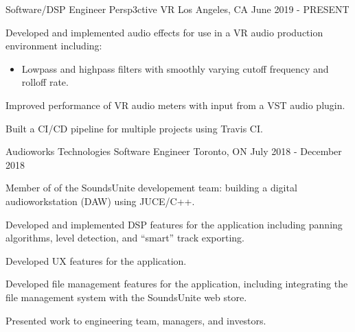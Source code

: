

\begin{cventries}

    \cventry
    {Software/DSP Engineer} %
    {Persp3ctive VR} %
    {Los Angeles, CA} %
    {June 2019 - PRESENT} %
    {
      \begin{cvitems} %
        \item {Developed and implemented audio effects for use in a VR audio production environment including:}
        \begin{itemize}
            \item{Lowpass and highpass filters with smoothly varying cutoff frequency and rolloff rate.}
        \end{itemize}
        \item {Improved performance of VR audio meters with input from a VST audio plugin.}
        \item {Built a CI/CD pipeline for multiple projects using Travis CI.}
      \end{cvitems}
    }

    \cventry
    {Audioworks Technologies} %
    {Software Engineer} %
    {Toronto, ON} %
    {July 2018 - December 2018} %
    {
      \begin{cvitems} %
        \item {Member of of the SoundsUnite developement team: building a digital audioworkstation (DAW) using JUCE/C++.}
        \item {Developed and implemented DSP features for the application including panning algorithms, level detection, and ``smart'' track exporting.}
        \item {Developed UX features for the application.}
        \item {Developed file management features for the application, including integrating the file management system with the SoundsUnite web store.}
        \item {Presented work to engineering team, managers, and investors.}
      \end{cvitems}
    }


\end{cventries}
